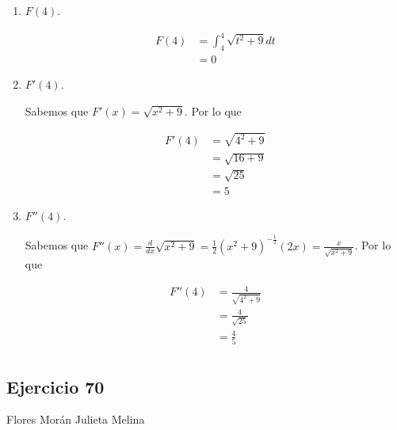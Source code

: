 \documentclass[12pt]{article}
\begin{document}
\begin{enumerate}[label=(\alph*)]
  
\item $F(4)$.
  
\begin{align*}
  F(4)
  & = \int_{4}^{4} \sqrt{t^2+9}dt  \\
  & = 0
\end{align*}
  
\item $F'(4)$.

  Sabemos que $F'(x)=\sqrt{x^2+9}$. Por lo que
  
\begin{align*}
  F'(4)
  & = \sqrt{4^2+9}  \\
  & = \sqrt{16+9} \\
  &= \sqrt{25} \\
  &= 5
\end{align*}
  
\item $F''(4)$.

  Sabemos que $F''(x)=\frac{d}{dx}\sqrt{x^2+9}=\frac{1}{2}(x^2+9)^{-\frac{1}{2}}(2x)=\frac{x}{\sqrt{x^2+9}}$. Por lo que
  
\begin{align*}
  F''(4)
  & = \frac{4}{\sqrt{4^2+9}} \\
  &= \frac{4}{\sqrt{25}} \\
  &=\frac{4}{5}\\
\end{align*}
  
\end{enumerate}

\subsection{Ejercicio 70} Flores Morán Julieta Melina \\
\end{document}
